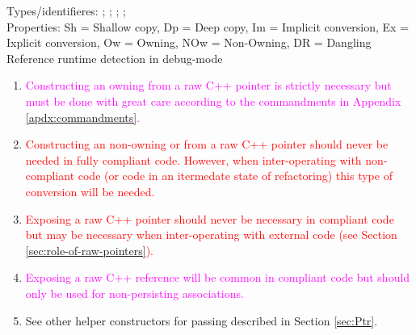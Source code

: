 %
\begin{minipage}{\textwidth}

Types/identifieres: {}; {}; {}; {}; \\

Properties: Sh = Shallow copy, Dp = Deep copy, Im = Implicit
conversion, Ex = Ixplicit conversion, Ow = Owning, NOw = Non-Owning,
DR = Dangling Reference runtime detection in debug-mode

\begin{enumerate}
%
{}\item\label{conv:rcp-owning}\textcolor{magenta}{Constructing an
owning {} from a raw C++ pointer is strictly necessary but
must be done with great care according to the commandments in Appendix
{}\ref{apdx:commandments}.}
%
{}\item\label{conv:rcp-nonowning}\textcolor{red}{Constructing an
non-owning {} or {} from a raw C++ pointer should
never be needed in fully compliant code.  However, when
inter-operating with non-compliant code (or code in an itermedate
state of refactoring) this type of conversion will be needed.}
%
{}\item\label{conv:obj-expose-raw-ptr}\textcolor{red}{Exposing a raw
C++ pointer should never be necessary in compliant code but may be
necessary when inter-operating with external code (see Section
{}\ref{sec:role-of-raw-pointers}).}
%
{}\item\label{conv:obj-expose-raw-ref}\textcolor{magenta}{Exposing a
raw C++ reference will be common in compliant code but should only be
used for non-persisting associations.}
%
{}\item\label{conv:ptr-helpers} See other helper constructors for
passing {} described in Section {}\ref{sec:Ptr}.
%
\end{enumerate}

\end{minipage}
